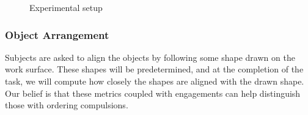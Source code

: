 \documentclass[11pt]{article}
\begin{document}
\begin{figure}%
    \centering
    \qquad
    \caption{Experimental setup}%
    \label{setup}%
\end{figure}
\subsubsection{Object Arrangement}
Subjects are asked to align the objects by following some shape drawn on the work surface. These shapes will be predetermined, and at the completion of the task, we will compute how closely the shapes are aligned with the drawn shape. Our belief is that these metrics coupled with engagements can help distinguish those with ordering compulsions.
\end{document}
